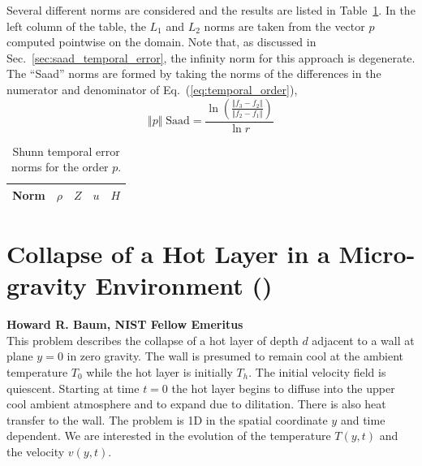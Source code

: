 \documentclass[11pt]{book}
\begin{document}
Several different norms are considered and the results are listed in Table~\ref{tab:shunn_terr_norms}.  In the left column of the table, the $L_1$ and $L_2$ norms are taken from the vector $p$ computed pointwise on the domain.  Note that, as discussed in Sec.~\ref{sec:saad_temporal_error}, the infinity norm for this approach is degenerate.  The ``Saad'' norms are formed by taking the norms of the differences in the numerator and denominator of Eq.~(\ref{eq:temporal_order}),
\begin{equation}
\Vert p \Vert \; \mbox{Saad} = \frac{ \ln \left( \frac{\Vert f_3-f_2 \Vert}{\Vert f_2-f_1 \Vert} \right) }{\ln r}
\end{equation}

\begin{table}[ht]
\centering
\caption[Shunn temporal error norms]{Shunn temporal error norms for the order $p$.}
\begin{tabular}{lcccc}
Norm & $\rho$ & $Z$ & $u$ & $H$ \\
\hline

\end{tabular}
\label{tab:shunn_terr_norms}
\end{table}


\clearpage

\section{Collapse of a Hot Layer in a Micro-gravity Environment (\texorpdfstring{}{hot\_layer\_360})}
\label{sec:baum_hot_layer}

\textbf{Howard R. Baum, NIST Fellow Emeritus}\\

\noindent This problem describes the collapse of a hot layer of depth $d$ adjacent to a wall at plane $y=0$ in zero gravity.  The wall is presumed to remain cool at the ambient temperature $T_0$ while the hot layer is initially $T_h$.  The initial velocity field is quiescent.  Starting at time $t=0$ the hot layer begins to diffuse into the upper cool ambient atmosphere and to expand due to dilitation.  There is also heat transfer to the wall.  The problem is 1D in the spatial coordinate $y$ and time dependent.  We are interested in the evolution of the temperature $T(y,t)$ and the velocity $v(y,t)$.
\end{document}
